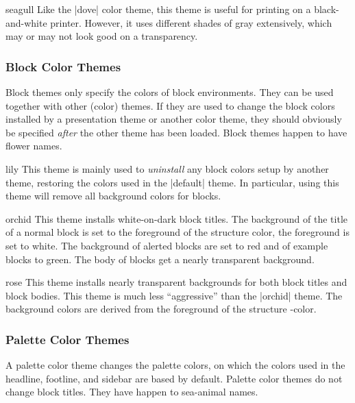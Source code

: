 \begin{colorthemeexample}{seagull}
  Like the |dove| color theme, this theme is useful for printing on a
  black-and-white printer. However, it uses different shades of gray
  extensively, which may or may not look good on a transparency.
\end{colorthemeexample}


\subsubsection{Block Color Themes}

Block themes only specify the colors of block environments. They can
be used together with other (color) themes. If they are used to change the
block colors installed by a presentation theme or another color theme,
they should obviously be specified \emph{after} the other theme has
been loaded. Block themes happen to have flower names.

\begin{colorthemeexample}{lily}
  This theme is mainly used to \emph{uninstall} any block colors setup
  by another theme, restoring the colors used in the |default|
  theme. In particular, using this theme will remove all background
  colors for blocks.
\end{colorthemeexample}

\begin{colorthemeexample}{orchid}
  This theme installs white-on-dark block titles. The background of
  the title of a normal block is set to the foreground of the
  structure color, the foreground is set to white. The background of
  alerted blocks are set to red and of example blocks to green. The
  body of blocks get a nearly transparent background.
\end{colorthemeexample}

\begin{colorthemeexample}{rose}
  This theme installs nearly transparent backgrounds for both block
  titles and block bodies. This theme is much less ``aggressive'' than
  the |orchid| theme. The background colors are derived from the
  foreground of the structure \beamer-color.
\end{colorthemeexample}


\subsubsection{Palette Color Themes}

A palette color theme  changes the palette colors, on which the colors
used in the headline, footline, and sidebar 
are based by default. Palette color themes do not change block
titles. They have happen to sea-animal names.

